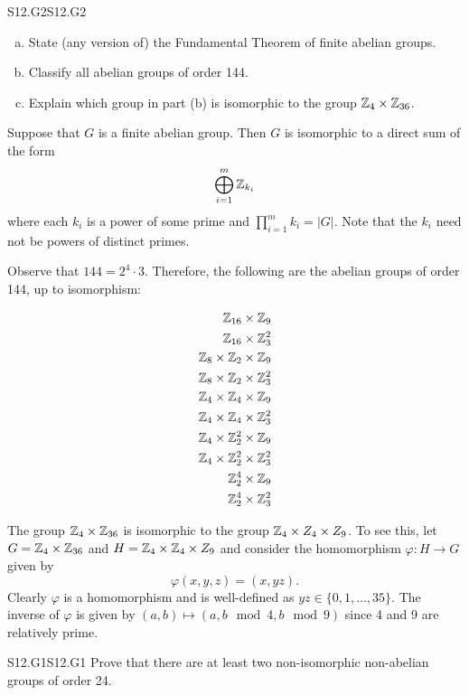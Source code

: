 \documentclass[../AlgebraQualSolutions.tex]{subfiles}
\begin{document}
\begin{prob}{S12.G2}{S12.G2}
	\begin{enumerate}[(a)]
		\item State (any version of) the Fundamental Theorem of finite abelian groups.
		\item Classify all abelian groups of order 144.
		\item Explain which group in part (b) is isomorphic to the group $\mathbb{Z}_4 \times \mathbb{Z}_{36}$.
	\end{enumerate}
\end{prob}

Suppose that $G$ is a finite abelian group. Then $G$ is isomorphic to a direct sum of the form
	\[\bigoplus_{i=1}^m \mathbb{Z}_{k_i}\]
where each $k_i$ is a power of some prime and $\prod_{i=1}^m k_i = |G|$. Note that the $k_i$ need not be powers of distinct primes.

\begin{solution}
Observe that $144 = 2^4 \cdot 3$. Therefore, the following are the abelian groups of order 144, up to isomorphism:

\begin{align*}
	\mathbb{Z}_{16} \times \mathbb{Z}_9 \\
	\mathbb{Z}_{16} \times \mathbb{Z}_3^2 \\
	\mathbb{Z}_8 \times \mathbb{Z}_2 \times \mathbb{Z}_9 \\
	\mathbb{Z}_8 \times \mathbb{Z}_2 \times \mathbb{Z}_3^2\\
	\mathbb{Z}_4 \times \mathbb{Z}_4 \times \mathbb{Z}_9 \\
	\mathbb{Z}_4 \times \mathbb{Z}_4 \times \mathbb{Z}_3^2\\
	\mathbb{Z}_4 \times \mathbb{Z}_2^2 \times \mathbb{Z}_9 \\
	\mathbb{Z}_4 \times \mathbb{Z}_2^2 \times \mathbb{Z}_3^2 \\
	\mathbb{Z}_2^4 \times \mathbb{Z}_9 \\
	\mathbb{Z}_2^4 \times \mathbb{Z}_3^2 \\
\end{align*}

The group $\mathbb{Z}_4 \times \mathbb{Z}_{36}$ is isomorphic to the group $\mathbb{Z}_4 \times Z_4 \times Z_9$. To see this, let $G = \mathbb{Z}_4 \times \mathbb{Z}_{36}$ and $H = \mathbb{Z}_4 \times \mathbb{Z}_{4} \times Z_9$ and consider the homomorphism $\varphi: H \to G$ given by
	\[\varphi(x,y,z) = (x,yz). \]
Clearly $\varphi$ is a homomorphism and is well-defined as $yz \in \{0,1, \ldots, 35\}$. The inverse of $\varphi$ is given by $(a,b) \mapsto(a,b\mod{4},b\mod{9})$ since 4 and 9 are relatively prime.
\end{solution}

\begin{prob}{S12.G1}{S12.G1}
	Prove that there are at least two non-isomorphic non-abelian groups of order 24.
\end{prob}
\end{document}
